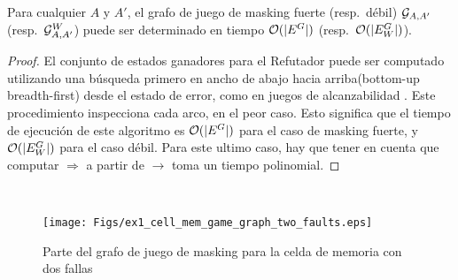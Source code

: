 \begin{theorem}\label{thm:game-determined}
  Para cualquier $A$ y $A'$, el grafo de juego de masking fuerte (resp.\ débil) 
  $\mathcal{G}_{A, A'}$ (resp.\ $\mathcal{G}^W_{A,A'}$) puede ser determinado en tiempo $\mathcal{O}(|E^G|)$ (resp.\ $\mathcal{O}(|E_W^G|)$).
\end{theorem}
\begin{proof}
El conjunto de estados ganadores para el Refutador puede ser computado utilizando una búsqueda primero en ancho de abajo hacia arriba(bottom-up breadth-first) desde el estado de error, como en juegos de alcanzabilidad \cite{Jurd11}. 
Este procedimiento inspecciona cada arco, en el peor caso. Esto significa que el tiempo de ejecución de este algoritmo es $\mathcal{O}(|E^G|)$ para el caso de masking fuerte, y $\mathcal{O}(|E_W^G|)$ para el caso débil. Para este ultimo caso, hay que tener en cuenta que computar  
$\Rightarrow$ a partir de $\rightarrow$ toma un tiempo polinomial.
\qedhere
\end{proof} \\
\begin{figure} [h]
\begin{center}
    \texttt{[image: Figs/ex1\_cell\_mem\_game\_graph\_two\_faults.eps]} 
    \caption{Parte del grafo de juego de masking para la celda de memoria con dos fallas}
    \label{figure:exam_2_mem_cell_gg_two_faults}
\end{center}
\end{figure}

